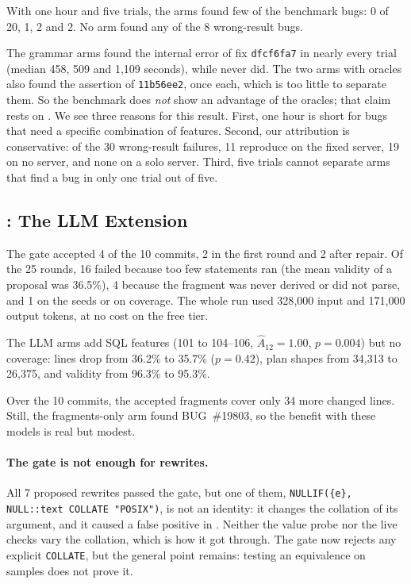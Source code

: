 \begin{observation}
\label{obs:rq3}
With one hour and five trials, the arms found few of the benchmark bugs:
 0 of 20,  1,  2 and 
2. No arm found any of the 8 wrong-result bugs.
\end{observation}

The grammar arms found the internal error of fix \texttt{dfcf6fa7} in nearly
every trial (median 458, 509 and 1{,}109 seconds), while  never did.
The two arms with oracles also found the assertion of \texttt{11b56ee2}, once
each, which is too little to separate them. So the benchmark does \emph{not}
show an advantage of the oracles; that claim rests on . We see three
reasons for this result. First, one hour is short for bugs that need a specific
combination of features. Second, our attribution is conservative: of the 30
wrong-result failures, 11 reproduce on the fixed server, 19 on no server, and
none on a solo server. Third, five trials cannot separate arms that find a bug in
only one trial out of five.

\subsection{: The LLM Extension}
\label{sec:rq4}

The gate accepted 4 of the 10 commits, 2 in the first round and 2 after repair.
Of the 25 rounds, 16 failed because too few statements ran (the mean validity of
a proposal was 36.5\%), 4 because the fragment was never derived or did not
parse, and 1 on the seeds or on coverage. The whole run used 328{,}000 input and
171{,}000 output tokens, at no cost on the free tier.

\begin{observation}
\label{obs:llm}
The LLM arms add SQL features (101 to 104--106, $\hat{A}_{12}=1.00$,
$p=0.004$) but no coverage: lines drop from 36.2\% to 35.7\% ($p=0.42$), plan
shapes from 34{,}313 to 26{,}375, and validity from 96.3\% to 95.3\%.
\end{observation}

Over the 10 commits, the accepted fragments cover only 34 more changed lines.
Still, the fragments-only arm found BUG~\#19803, so the benefit with these
models is real but modest.

\paragraph{The gate is not enough for rewrites.} All 7 proposed rewrites passed
the gate, but one of them, \texttt{NULLIF(\{e\}, NULL::text COLLATE "POSIX")},
is not an identity: it changes the collation of its argument, and it caused a
false positive in . Neither the value probe nor the live checks vary
the collation, which is how it got through. The gate now rejects any explicit
\texttt{COLLATE}, but the general point remains: testing an equivalence on
samples does not prove it.
